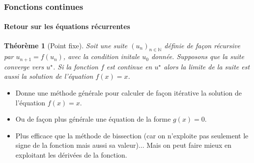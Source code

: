 \documentclass[10pt,notheorems]{beamer}
\theoremstyle{plain}
\newtheorem{theorem}{Théorème}
\theoremstyle{definition} %
\begin{document}
\begin{frame}
  \frametitle{Fonctions continues}
  \framesubtitle{Retour sur les équations récurrentes}

  \begin{theorem}[Point fixe]
    Soit une suite $(u_n)_{n\in\mathbb N}$ définie de façon récursive par $u_{n+1} = f(u_n)$, avec la condition initale $u_0$ donnée. Supposons que la suite converge vers $u^{\star}$. Si la fonction $f$ est continue en $u^{\star}$ alors la limite de la suite est aussi la solution de l'équation $f(x) = x$.
  \end{theorem}

  \bigskip

  \begin{itemize}

  \item Donne une méthode générale pour calculer de façon itérative la solution de l'équation $f(x)=x$.\newline

  \item Ou de façon plus générale une équation de la forme $g(x) = 0$.\newline

  \item Plus efficace que la méthode de bissection (car on n'exploite pas seulement le signe de la fonction mais aussi sa valeur)... Mais on peut faire mieux en exploitant les dérivées de la fonction.

  \end{itemize}

\end{frame}
\end{document}
